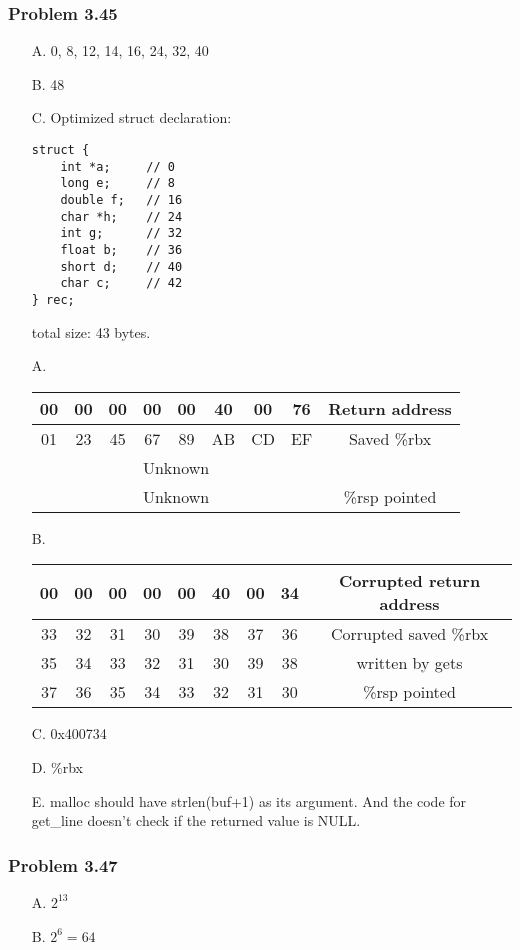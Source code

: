 \documentclass[a4paper]{article}
\begin{document}
\subsubsection*{Problem 3.45}
\begin{enumerate}
    \item [A.] 0, 8, 12, 14, 16, 24, 32, 40
    \item [B.] 48
    \item [C.] Optimized struct declaration:
    \begin{lstlisting}
struct {
    int *a;     // 0
    long e;     // 8
    double f;   // 16
    char *h;    // 24
    int g;      // 32
    float b;    // 36
    short d;    // 40
    char c;     // 42
} rec;
    \end{lstlisting}
    total size: 43 bytes.
\end{enumerate}

\begin{enumerate}
    \item [A.]
    \begin{tabular}{|cccccccc|c|}
        \hline
        00&00&00&00&00&40&00&76&Return address\\
        \hline
        01&23&45&67&89&AB&CD&EF&Saved \%rbx\\
        \hline
        \multicolumn{8}{|c|}{Unknown}&\\
        \hline
        \multicolumn{8}{|c|}{Unknown}&\%rsp pointed\\
        \hline
    \end{tabular}
    \item [B.]
    \begin{tabular}{|cccccccc|c|}
        \hline
        00&00&00&00&00&40&00&34&Corrupted return address\\
        \hline
        33&32&31&30&39&38&37&36&Corrupted saved \%rbx\\
        \hline
        35&34&33&32&31&30&39&38&written by gets\\
        \hline
        37&36&35&34&33&32&31&30&\%rsp pointed\\
        \hline
    \end{tabular}
    \item [C.] 0x400734
    \item [D.] \%rbx
    \item [E.] malloc should have strlen(buf+1) as its argument. And the code for get\_line doesn't check if the returned value is NULL.
\end{enumerate}

\subsubsection*{Problem 3.47}
\begin{enumerate}
    \item [A.] $2^{13}$
    \item [B.] $2^6=64$
\end{enumerate}
\end{document}
